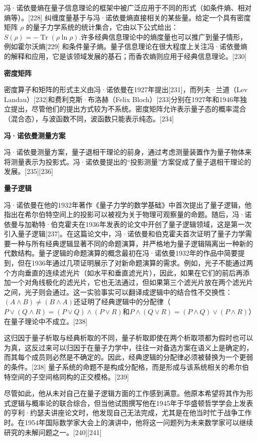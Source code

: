 冯·诺依曼熵在量子信息理论的框架中被广泛应用于不同的形式（如条件熵、相对熵等）。[228] 纠缠度量基于与冯·诺依曼熵直接相关的某些量。给定一个具有密度矩阵 \(\rho\) 的量子力学系统的统计集合，它由以下公式给出：\(
S(\rho) = -\operatorname{Tr}(\rho \ln \rho).\)许多经典信息理论中的熵度量也可以推广到量子情形，例如霍尔沃熵[229] 和条件量子熵。量子信息理论在很大程度上关注冯·诺依曼熵的解释和应用，它是该领域发展的基石；而香农熵则应用于经典信息理论。[230]

\textbf{密度矩阵}  
  
密度算子和矩阵的形式主义由冯·诺依曼在1927年提出[231]，而列夫·兰道（Lev Landau）[232]和费利克斯·布洛赫（Felix Bloch）[233]分别在1927年和1946年独立提出，尽管他们的提出方式较为不系统。密度矩阵允许表示量子态的概率混合（混合态），与波函数不同，波函数只能表示纯态。[234]

\textbf{冯·诺依曼测量方案}  

冯·诺依曼测量方案，量子退相干理论的前身，通过考虑测量装置作为量子物体来将测量表示为投影式。冯·诺依曼提出的“投影测量”方案促成了量子退相干理论的发展。[235][236]

\textbf{量子逻辑}  

冯·诺依曼在他的1932年著作《量子力学的数学基础》中首次提出了量子逻辑，他指出在希尔伯特空间上的投影可以被视为关于物理可观察量的命题。随后，冯·诺依曼与加勒特·伯克霍夫在1936年发表的论文中开创了量子逻辑领域，这是第一次引入量子逻辑[237]。在这篇论文中，冯·诺依曼和伯克霍夫首次证明了量子力学需要一种与所有经典逻辑显著不同的命题演算，并严格地为量子逻辑隔离出一种新的代数结构。量子逻辑的命题演算的概念最初在冯·诺依曼1932年的作品中简要提到，但在1936年通过几项证明展示了对新命题演算的需求。例如，光子不能通过两个方向垂直的连续滤光片（如水平和垂直滤光片），因此，如果在它们的前后再添加一个对角线极化的滤光片，它也无法通过，但如果第三个滤光片放在两个滤光片之间，光子则会通过。这一实验事实可以翻译成逻辑中的结合性不交换性：\((A \land B) \neq (B \land A)\)还证明了经典逻辑中的分配律（ \(P \lor (Q \land R) = (P \lor Q) \land (P \lor R)\)和\(P \land (Q \lor R) = (P \land Q) \lor (P \land R)\)）在量子理论中不成立。[238]

这归因于量子析取与经典析取的不同，量子析取即使在两个析取项都为假时也可以为真，这反过来可以归因于在量子力学中，往往一对备选方案在语义上是确定的，而其每个成员则必然是不确定的。因此，经典逻辑的分配律必须被替换为一个更弱的条件。[238] 量子系统的命题不是构成分配格，而是形成与该系统相关的希尔伯特空间的子空间格同构的正交模格。[239]

尽管如此，他从未对自己在量子逻辑方面的工作感到满意。他原本希望将其作为形式逻辑与概率论的联合综合，但当他试图撰写他在1945年于华盛顿哲学学会上发表的亨利·约瑟夫讲座论文时，他发现自己无法完成，尤其是在他当时忙于战争工作时。在1954年国际数学家大会上的演讲中，他将这一问题列为未来数学家可以继续研究的未解问题之一。[240][241]
